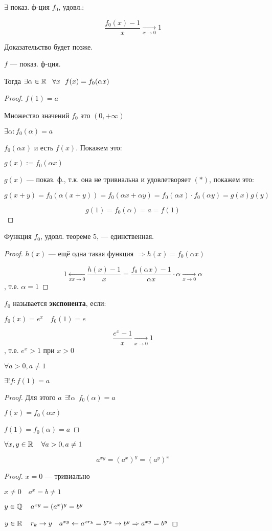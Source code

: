 \begin{theorem}
    $\exists$ показ. ф-ция $f_0$, удовл.:

    $$\frac{f_0 (x)-1}{x}\xrightarrow[x\to0]{} 1$$
\end{theorem}
Доказательство будет позже.
\begin{theorem}
    $f$ --- показ. ф-ция.
    
    Тогда $\exists \alpha\in\R \ \ \forall x \ \ f(x)=f_0(\alpha x)$
\end{theorem}
\begin{proof}
    $f(1)=a$

    Множество значений $f_0$ это $(0, +\infty)$

    $\exists \alpha : f_0(\alpha)=a$

    $f_0(\alpha x)$ и есть $f(x)$. Покажем это:

    $g(x):=f_0(\alpha x)$

    $g(x)$ --- показ. ф., т.к. она не тривиальна и удовлетворяет $(*)$, покажем это:

    $$g(x+y)=f_0(\alpha(x+y))=f_0(\alpha x + \alpha y)=f_0(\alpha x) \cdot f_0(\alpha y) = g(x)g(y)$$

    $$g(1)=f_0(\alpha)=a=f(1)$$
\end{proof}
\begin{consequence}
    Функция $f_0$, удовл. теореме 5, --- единственная.
\end{consequence}
\begin{proof}
    $h(x)$ --- ещё одна такая функция $\Rightarrow h(x)=f_0(\alpha x)$

    $$1\xleftarrow[xx\to0]{} \frac{h(x)-1}{x}=\frac{f_0(\alpha x)-1}{\alpha x}\cdot \alpha\xrightarrow[x\to0]{}\alpha$$
    , т.е. $\alpha=1$
\end{proof}
\begin{definition}
    $f_0$ называется \textbf{экспонента}, если:

    $f_0(x)=e^x\quad f_0(1)=e$

    $$\frac{e^x-1}{x}\xrightarrow[x\to0]{} 1$$
    , т.е. $e^x>1$ при $x>0$
\end{definition}
\begin{consequence}
    $\forall a>0, a\not=1$

    $\exists! f:f(1)=a$
\end{consequence}
\begin{proof}
    Для этого $a \ \ \exists!\alpha \ \ f_0(\alpha)=a$

    $f(x)=f_0(\alpha x)$

    $f(1)=f_0(\alpha)=a$
\end{proof}
\begin{consequence}
    $\forall x, y\in\operatorname*{\mathbb{R}} \quad \forall a>0, a\not=1$

    $$a^{xy}=(a^x)^y=(a^y)^x$$
\end{consequence}
\begin{proof}
    $x=0$ --- тривиально

    $x\not=0 \quad a^x=b\not=1$

    $y\in\operatorname*{\mathbb{Q}} \quad a^{xy}=(a^x)^y=b^y$

    $y\in\operatorname*{\mathbb{R}} \quad r_k\to y \quad a^{xy}\leftarrow a^{xr_k}=b^{r_k} \rightarrow b^y\Rightarrow a^{xy}=b^y$
\end{proof}
